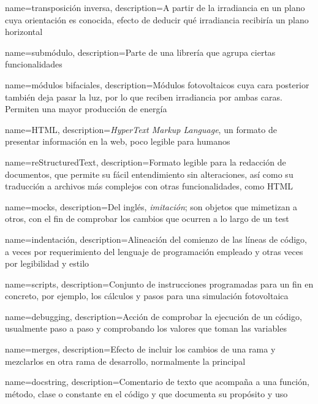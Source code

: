 {
    name={transposición inversa},
    description={A partir de la irradiancia en un plano cuya orientación es conocida, efecto de deducir qué irradiancia recibiría un plano horizontal}
}

{
    name={submódulo},
    description={Parte de una \gls{librería} que agrupa ciertas funcionalidades}
}

{
    name={módulos bifaciales},
    description={Módulos fotovoltaicos cuya cara posterior también deja pasar la luz, por lo que reciben irradiancia por ambas caras. Permiten una mayor producción de energía}
}

{
    name={HTML},
    description={\textit{HyperText Markup Language}, un formato de presentar información en la web, poco legible para humanos}
}

{
    name={reStructuredText},
    description={Formato legible para la redacción de documentos, que permite su fácil entendimiento sin alteraciones, así como su traducción a archivos más complejos con otras funcionalidades, como \gls{HTML}}
}

{
    name={mocks},
    description={Del inglés, \textit{imitación}; son objetos que mimetizan a otros, con el fin de comprobar los cambios que ocurren a lo largo de un test}
}

{
    name={indentación},
    description={Alineación del comienzo de las líneas de código, a veces por requerimiento del lenguaje de programación empleado y otras veces por legibilidad y estilo}
}

{
    name={scripts},
    description={Conjunto de instrucciones programadas para un fin en concreto, por ejemplo, los cálculos y pasos para una simulación fotovoltaica}
}

{
    name={debugging},
    description={Acción de comprobar la ejecución de un código, usualmente paso a paso y comprobando los valores que toman las variables}
}

{
    name={merges},
    description={Efecto de incluir los cambios de una \gls{rama} y mezclarlos en otra rama de desarrollo, normalmente la principal}
}

{
    name={docstring},
    description={Comentario de texto que acompaña a una función, método, clase o constante en el código y que documenta su propósito y uso}
}

